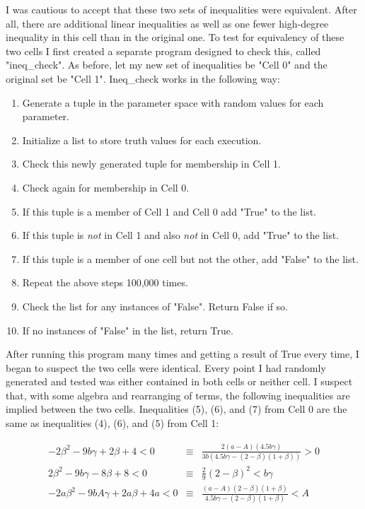 \documentclass{article}
\begin{document}
I was cautious to accept that these two sets of inequalities were equivalent. After all, there are additional linear inequalities as well as one fewer high-degree inequality in this cell than in the original one. To test for equivalency of these two cells I first created a separate program designed to check this, called "ineq\_check". As before, let my new set of inequalities be "Cell 0" and the original set be "Cell 1". Ineq\_check works in the following way:
\begin{enumerate}
    \item Generate a tuple in the parameter space with random values for each parameter.
    \item Initialize a list to store truth values for each execution.
    \item Check this newly generated tuple for membership in Cell 1.
    \item Check again for membership in Cell 0. 
    \item If this tuple is a member of Cell 1 and Cell 0 add "True" to the list.
    \item If this tuple is \emph{not} in Cell 1 and also \emph{not} in Cell 0, add "True" to the list.
    \item If this tuple is a member of one cell but not the other, add "False" to the list.
    \item Repeat the above steps 100,000 times.
    \item Check the list for any instances of "False". Return False if so.
    \item If no instances of "False" in the list, return True.
\end{enumerate}

After running this program many times and getting a result of True every time, I began to suspect the two cells were identical. Every point I had randomly generated and tested was either contained in both cells or neither cell. I suspect that, with some algebra and rearranging of terms, the following inequalities are implied between the two cells. Inequalities (5), (6), and (7) from Cell 0 are the same as inequalities (4), (6), and (5) from Cell 1:

\begin{eqnarray}
-2\beta^{2} - 9b\gamma + 2\beta + 4 < 0 &\equiv& \frac{2(a-A)(4.5b\gamma)}{3b(4.5b\gamma-(2-\beta)(1+\beta))}>0\\
2\beta^{2} - 9b\gamma - 8\beta + 8 < 0 &\equiv& \frac{2}{9}(2-\beta)^{2}<b\gamma\\
-2a\beta^{2} -9bA\gamma + 2a\beta +4a < 0 &\equiv& \frac{(a-A)(2-\beta)(1+\beta)}{4.5b\gamma-(2-\beta)(1+\beta)}<A
\end{eqnarray}
\end{document}
